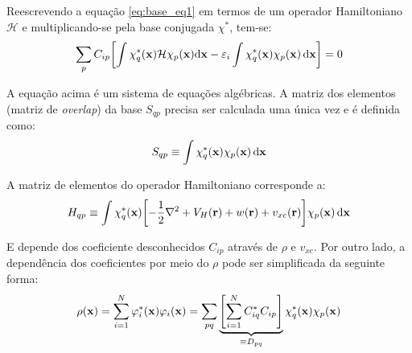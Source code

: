 Reescrevendo a equação \eqref{eq:base_eq1} em termos de um operador Hamiltoniano $ \mathcal{H} $ e multiplicando-se pela base conjugada $ \chi^\ast $, tem-se:
\begin{equation}\label{eq:base_eq2}
	\sum_p C_{ip}\bqty{\int\baseconj\mathcal{H}\base\dd\vb{x}-\varepsilon_i\int \baseconj\base \dd{\vb{x}}}=0
\end{equation}

A equação acima é um sistema de equações algébricas. A matriz dos elementos (matriz de \textit{overlap}) da base $ S_{qp}$ precisa ser calculada uma única vez e é definida como:
\begin{equation}
	S_{qp}\equiv \int \chi_q^{\ast}(\vb{x})\chi_p(\vb{x}) \dd{\vb{x}}
\end{equation}

A matriz de elementos do operador Hamiltoniano corresponde a:
\begin{equation}\label{eq:matriz_halm}
	H_{qp}\equiv\int\baseconj\bqty{-\frac{1}{2}\laplacian+V_H(\vb{r})+w(\vb{r})+v_{xc}(\vb{r})}\base \dd{\vb{x}}
\end{equation}

E depende dos coeficiente desconhecidos $ C_{ip} $ através de $ \rho $ e $ v_{xc} $. Por outro lado, a dependência dos coeficientes por meio do $ \rho $ pode ser simplificada da seguinte forma:
\begin{equation}
	\densx=\sum_{i=1}^{N} \orbitalconj \orbital =\sum_{pq}\underbrace{\bqty{\sum_{i=1}^{N}C_{iq}^{\ast}C_{ip}}}_{\equiv D_{pq}}\baseconj\base
\end{equation}

